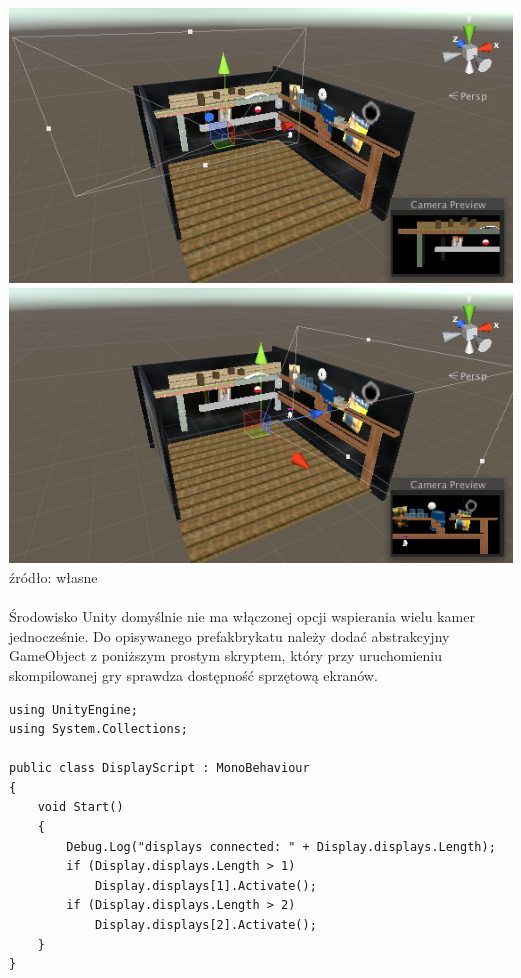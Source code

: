 \begin{center}
\includegraphics[width=1\textwidth]{images/kamera1.png}
\includegraphics[width=1\textwidth]{images/kamera2.png}
\small {źródło: własne }
\end{center}

\paragraph{}
Środowisko Unity domyślnie nie ma włączonej opcji wspierania wielu kamer jednocześnie. Do opisywanego prefakbrykatu należy dodać abstrakcyjny GameObject z poniższym prostym skryptem, który przy uruchomieniu skompilowanej gry sprawdza dostępność sprzętową ekranów.

\begin{lstlisting}[language=CSharp]
using UnityEngine;
using System.Collections;

public class DisplayScript : MonoBehaviour
{
	void Start()
	{
		Debug.Log("displays connected: " + Display.displays.Length);
		if (Display.displays.Length > 1)
			Display.displays[1].Activate();
		if (Display.displays.Length > 2)
			Display.displays[2].Activate();
	}
}
\end{lstlisting}

